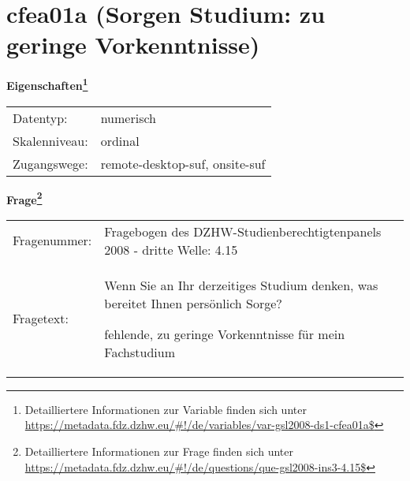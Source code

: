 
    \setcounter{footnote}{0}

    \vspace*{-1.8cm}
	\section{cfea01a (Sorgen Studium: zu geringe Vorkenntnisse)}
	\label{section:cfea01a}



    \vspace*{0.5cm}
    \noindent\textbf{Eigenschaften\footnote{Detailliertere Informationen zur Variable finden sich unter
		\url{https://metadata.fdz.dzhw.eu/\#!/de/variables/var-gsl2008-ds1-cfea01a$}}}\\
	\begin{tabularx}{\hsize}{@{}lX}
	Datentyp: & numerisch \\
	Skalenniveau: & ordinal \\
	Zugangswege: &
	  remote-desktop-suf, 
	  onsite-suf
 \\
    \end{tabularx}



				\vspace*{0.5cm}
                \noindent\textbf{Frage\footnote{Detailliertere Informationen zur Frage finden sich unter
		              \url{https://metadata.fdz.dzhw.eu/\#!/de/questions/que-gsl2008-ins3-4.15$}}}\\
				\begin{tabularx}{\hsize}{@{}lX}
					Fragenummer: &
					  Fragebogen des DZHW-Studienberechtigtenpanels 2008 - dritte Welle:
					  4.15
 \\
					Fragetext: & Wenn Sie an Ihr derzeitiges Studium denken, was bereitet Ihnen persönlich Sorge?\par  fehlende, zu geringe Vorkenntnisse für mein Fachstudium \\
				\end{tabularx}





